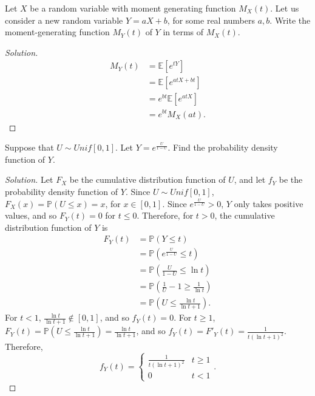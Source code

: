 \documentclass[addpoints, 11pt]{exam}
\newcommand*{\prob}{\mathds{P}}
\newcommand*{\E}{\mathds{E}}
\newenvironment{question}[1]{\smallskip\noindent\color{crimson}{\bf Question #1.}}{}
\begin{document}
\begin{question}{4}
    Let $X$ be a random variable with moment generating function $M_X(t)$. Let us consider a new random variable $Y = aX + b$, for some real numbers $a, b$. Write the moment-generating function $M_Y(t)$ of $Y$ in terms of $M_X(t)$.
\end{question}

\begin{proof}[Solution]
    \begin{align*}
        M_Y(t)
        &= \E[e^{tY}] \\
        &= \E[e^{atX + bt}] \\
        &= e^{bt}\E[e^{atX}] \\
        &= e^{bt}M_X(at).
    \end{align*}
\end{proof}

\newpage

\begin{question}{5}
    Suppose that $U \sim Unif[0, 1]$. Let $Y = e^{\frac{U}{1 - U}}$. Find the probability density function of $Y$.
\end{question}

\begin{proof}[Solution]
    Let $F_X$ be the cumulative distribution function of $U$, and let $f_Y$ be the probability density function of $Y$. Since $U \sim Unif[0, 1]$, $F_X(x) = \prob(U \leq x) = x$, for $x \in [0, 1]$. Since $e^{\frac{U}{1 - U}} > 0$, $Y$ only takes positive values, and so $F_Y(t) = 0$ for $t \leq 0$. Therefore, for $t > 0$, the cumulative distribution function of $Y$ is
    \begin{align*}
        F_Y(t)
        &= \prob(Y \leq t) \\
        &= \prob(e^{\frac{U}{1 - U}} \leq t) \\
        &= \prob\left(\frac{U}{1 - U} \leq \ln{t}\right) \\
        &= \prob\left(\frac{1}{U} - 1 \geq \frac{1}{\ln{t}}\right) \\
        &= \prob\left(U \leq \frac{\ln{t}}{\ln{t} + 1}\right).
    \end{align*}
    For $t < 1$, $\frac{\ln{t}}{\ln{t} + 1} \notin [0, 1]$, and so $f_Y(t) = 0$. For $t \geq 1$, $F_Y(t) = \prob\left(U \leq \frac{\ln{t}}{\ln{t} + 1}\right) = \frac{\ln{t}}{\ln{t} + 1}$, and so $f_Y(t) = F'_Y(t) = \frac{1}{t(\ln{t} + 1)^2}$. Therefore,
    \[
        f_Y(t) = \begin{cases}
            \frac{1}{t(\ln{t} + 1)^2} & t \geq 1 \\
            0 & t < 1
        \end{cases}.
    \]
\end{proof}
\end{document}
